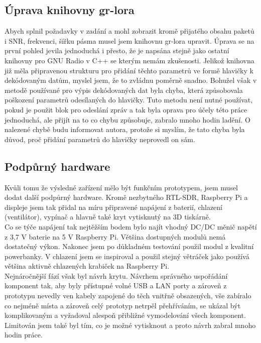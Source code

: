 \documentclass{ctuthesis}
\begin{document}
\subsection{Úprava knihovny gr-lora} \label{loraedit}
Abych splnil požadavky v zadání a mohl zobrazit kromě přijatého obsahu paketů i SNR, frekvenci, šířku pásma musel jsem knihovnu gr-lora upravit. Úprava se na první pohled jevila jednoduchá i přesto, že je napsána stejně jako ostatní knihovny pro GNU Radio v C++ se kterým nemám zkušenosti. Jelikož knihovna již měla připravenou strukturu pro přidání těchto parametrů ve formě hlavičky k dekódovaným datům, myslel jsem, že to zvládnu poměrně snadno. Bohužel však v metodě používané pro výpis dekódovaných dat byla chyba, která způsobovala poškození parametrů odesílaných do hlavičky. Tuto metodu není nutné používat, pokud je použit blok pro odeslání zpráv a tak byla oprava pro účely této práce jednoduchá, ale přijít na to co chybu způsobuje, zabralo mnoho hodin ladění. O nalezené chybě budu informovat autora, protože si myslím, že tato chyba byla důvod, proč přidání parametrů do hlavičky neprovedl on sám.

\subsection{Podpůrný hardware}
Kvůli tomu že výsledné zařízení mělo být funkčním prototypem, jsem musel dodat další podpůrný hardware. Kromě nezbytného RTL-SDR, Raspberry Pi a displeje jsem tak přidal na míru připravené napájení z baterií, chlazení (ventilátor), vypínač a hlavně také kryt vytisknutý na 3D tiskárně.\\
Co se týče napájení tak nejtěžším bodem bylo najít vhodný DC/DC měnič napětí z 3,7 V baterie na 5 V Raspberry Pi. Většina dostupných modulů nemá dostatečný výkon. Nakonec jsem po důkladném testování použil modul z kvalitní powerbanky. V chlazení jsem se inspiroval a použil stejný větráček jako používá většina aktivně chlazených krabiček na Raspberry Pi.\\
Nejnáročnější fází však byl návrh krytu. Návrhem správného uspořádání komponent tak, aby byly přístupné volné USB a LAN porty a zároveň z prototypu nevedly ven kabely zapojené do těch vnitřně obsazených, vše zabíralo co nejméně místa a zároveň celý prototyp netrpěl přehříváním, se ukázal být komplikovaným a vyžadoval alespoň přibližné vymodelování všech komponent. Limitován jsem také byl tím, co je možné vytisknout a proto návrh zabral mnoho hodin práce.
\end{document}
